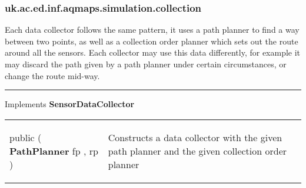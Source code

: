 \subsubsection*{ uk.ac.ed.inf.aqmaps.simulation.collection }
 {\scriptsize Each data collector follows the same pattern, it uses a path planner to find a way between two points, as well as a collection order planner which\newline%
 sets out the route around all the sensors. Each collector may use this data differently, for example it may discard the path given by a path planner under certain circumstances, or change the route mid{-}way.
 
\vspace*{4pt} \hrule \vspace*{3pt}
Implements \textbf{ SensorDataCollector }
\vspace*{-5pt} 
\begin{tabularx}{\linewidth}{m{}|m{}}
\label{tab:BaseDataCollector}
\begin{raggedleft}public  \textbf{\hyperref[tab:BaseDataCollector]{\color{blue}{BaseDataCollector}} }(\newline \hfill 
\hspace*{ 5pt} \textbf{PathPlanner} fp , \newline
 \hspace*{ 5pt} \textbf{\hyperref[tab:BaseCollectionOrderPlanner]{\color{blue}{BaseCollectionOrderPlanner}}} rp  )
\end{raggedleft} &
 Constructs a data collector with the given path planner and the given collection order planner\\\end{tabularx}
}
